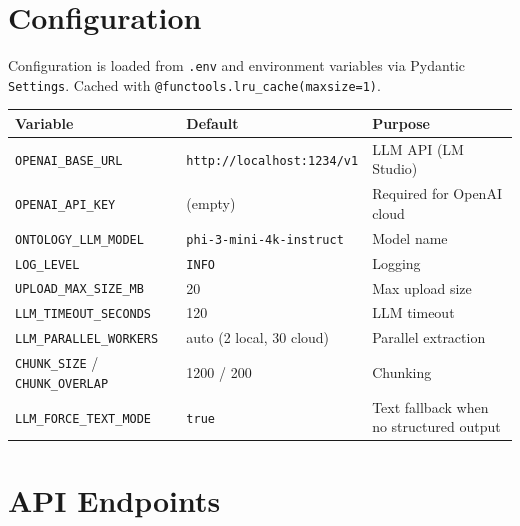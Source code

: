 \documentclass[11pt,a4paper]{article}
\begin{document}
\section{Configuration}

Configuration is loaded from \texttt{.env} and environment variables via Pydantic \texttt{Settings}. Cached with \texttt{@functools.lru\_cache(maxsize=1)}.

\begin{center}
\begin{tabular}{@{}llp{5cm}@{}}
\toprule
\textbf{Variable} & \textbf{Default} & \textbf{Purpose} \\
\midrule
\texttt{OPENAI\_BASE\_URL} & \texttt{http://localhost:1234/v1} & LLM API (LM Studio) \\
\texttt{OPENAI\_API\_KEY} & (empty) & Required for OpenAI cloud \\
\texttt{ONTOLOGY\_LLM\_MODEL} & \texttt{phi-3-mini-4k-instruct} & Model name \\
\texttt{LOG\_LEVEL} & \texttt{INFO} & Logging \\
\texttt{UPLOAD\_MAX\_SIZE\_MB} & 20 & Max upload size \\
\texttt{LLM\_TIMEOUT\_SECONDS} & 120 & LLM timeout \\
\texttt{LLM\_PARALLEL\_WORKERS} & auto (2 local, 30 cloud) & Parallel extraction \\
\texttt{CHUNK\_SIZE} / \texttt{CHUNK\_OVERLAP} & 1200 / 200 & Chunking \\
\texttt{LLM\_FORCE\_TEXT\_MODE} & \texttt{true} & Text fallback when no structured output \\
\bottomrule
\end{tabular}
\end{center}

\section{API Endpoints}
\end{document}
